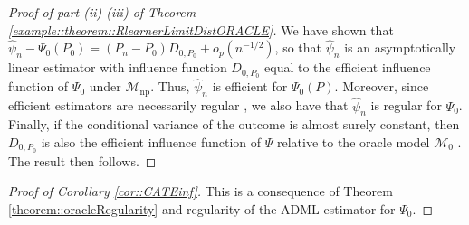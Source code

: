 \documentclass[11pt]{article}
\theoremstyle{definition}
\begin{document}
\begin{proof}[Proof of part (ii)-(iii) of Theorem   \ref{example::theorem::RlearnerLimitDistORACLE}]
We have shown that $  \widehat{\psi}_n - \Psi_0(P_0) = (P_n - P_0) D_{0,P_0} + o_p(n^{-1/2}) $, so that $\widehat{\psi}_n$ is an asymptotically linear estimator with influence function $D_{0,P_0}$ equal to the efficient influence function of $\Psi_0$ under $\mathcal{M}_{\mathrm{np}}$. Thus, $\widehat{\psi}_n$ is efficient for $\Psi_0(P)$. Moreover, since efficient estimators are necessarily regular \citep{vanderVaartWellner}, we also have that $\widehat{\psi}_n$ is regular for $\Psi_0$. Finally, if the conditional variance of the outcome is almost surely constant, then $D_{0,P_0}$ is also the efficient influence function of $\Psi$ relative to the oracle model $\mathcal{M}_0$ \citep{chernoRegRiesz}. The result then follows.\end{proof}
  


 

\begin{proof}[Proof of Corollary \ref{cor::CATEinf}]
    This is a consequence of Theorem \ref{theorem::oracleRegularity} and regularity of the ADML estimator for $\Psi_0$.\end{proof}



 
 

 
\end{document}
